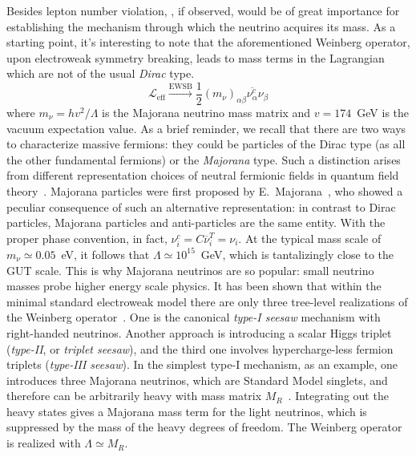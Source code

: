 Besides lepton number violation, \onbb, if observed, would be of great importance for
establishing the mechanism through which the neutrino acquires its mass. As a starting
point, it's interesting to note that the aforementioned Weinberg operator, upon
electroweak symmetry breaking, leads to mass terms in the Lagrangian which are not of the
usual \emph{Dirac} type.
\begin{equation}\label{eq:nbb:wein-sb}
  \mathcal{L}_\text{eff} \xrightarrow{\text{EWSB}} \frac{1}{2} {(m_\nu)}_{\alpha\beta}
                                                   \overline{\nu_\alpha^c} \nu_\beta
\end{equation}
where $m_\nu = h v^2 / \Lambda$ is the Majorana neutrino mass matrix and $v = 174$~GeV is
the vacuum expectation value.  As a brief reminder, we recall that there are two ways to
characterize massive fermions: they could be particles of the Dirac type (as all the other
fundamental fermions) or the \emph{Majorana} type.  Such a distinction arises from
different representation choices of neutral fermionic fields in quantum field
theory~\cite{Giunti2007}.  Majorana particles were first proposed by
E.~Majorana~\cite{Majorana1932}, who showed a peculiar consequence of such an alternative
representation: in contrast to Dirac particles, Majorana particles and anti-particles are
the same entity. With the proper phase convention, in fact, $\nu_i^c = C\overline{\nu}^T_i
= \nu_i$. At the typical mass scale of $m_\nu \simeq 0.05$~eV, it follows that $\Lambda
\simeq 10^{15}$~GeV, which is tantalizingly close to the GUT scale. This is why Majorana
neutrinos are so popular: small neutrino masses probe higher energy scale physics.
\newpar
It has been shown that within the minimal standard electroweak model there are only three
tree-level realizations of the Weinberg operator~\cite{Ma1998}.  One is the canonical
\emph{type-I seesaw} mechanism with right-handed neutrinos.  Another approach is
introducing a scalar Higgs triplet (\emph{type-II}, or \emph{triplet seesaw}), and the
third one involves hypercharge-less fermion triplets (\emph{type-III seesaw}).  In the
simplest type-I mechanism, as an example, one introduces three Majorana neutrinos, which
are Standard Model singlets, and therefore can be arbitrarily heavy with mass matrix
$M_R$~\cite{Mohapatra1979}.  Integrating out the heavy states gives a Majorana mass term
for the light neutrinos, which is suppressed by the mass of the heavy degrees of freedom.
The Weinberg operator is realized with $\Lambda \simeq M_R$.
